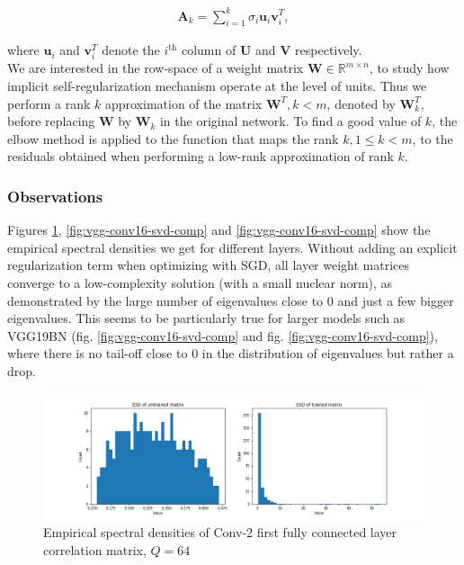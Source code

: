 \begin{align*}
\mathbf{A}_k = \sum\limits_{i=1}^k \sigma_i \mathbf{u}_i \mathbf{v}_i^T,
\end{align*}

where $\mathbf{u}_i$ and $\mathbf{v}_i^T$ denote the $i^{\text{th}}$ column of $\mathbf{U}$ and $\mathbf{V}$ respectively. \\

We are interested in the row-space of a weight matrix $\mathbf{W} \in \mathbb{R}^{m \times n}$, to study how implicit self-regularization mechanism operate at the level of units. Thus we perform a rank $k$ approximation of the matrix $\mathbf{W}^T, k < m$, denoted by $\mathbf{W}_k^T$, before replacing $\mathbf{W}$ by $\mathbf{W}_k$ in the original network. To find a good value of $k$, the elbow method is applied to the function that maps the rank $k, 1 \leq k < m$, to the residuals obtained when performing a low-rank approximation of rank $k$.

\subsubsection*{Observations}

Figures \ref{fig:conv2-fc1-svd-comp}, \ref{fig:vgg-conv16-svd-comp} and \ref{fig:vgg-conv16-svd-comp} show the empirical spectral densities we get for different layers. Without adding an explicit regularization term when optimizing with SGD, all layer weight matrices converge to a low-complexity solution (with a small nuclear norm), as demonstrated by the large number of eigenvalues close to 0 and just a few bigger eigenvalues. This seems to be particularly true for larger models such as VGG19BN (fig. \ref{fig:vgg-conv16-svd-comp} and fig. \ref{fig:vgg-conv16-svd-comp}), where there is no tail-off close to 0 in the distribution of eigenvalues but rather a drop. \\

\begin{figure}[H]
\centering
	\includegraphics[scale=0.36]{images/conv2-fc1-svd-comp.png}
\caption{Empirical spectral densities of Conv-2 first fully connected layer correlation matrix, $Q = 64$}
\label{fig:conv2-fc1-svd-comp} 
\end{figure}


